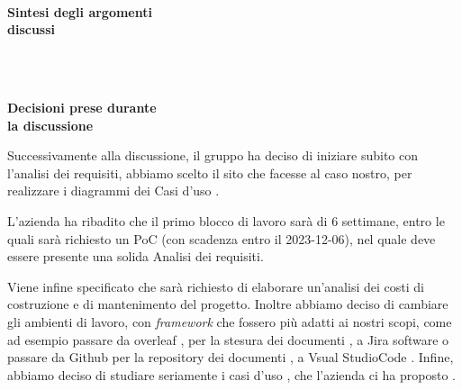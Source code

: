 \documentclass[10pt, a4paper]{article}
\title{\data}
\author{SWEetCode}
\begin{document}


\setlength{\columnsep}{2.2em}
\setlength{\columnseprule}{4pt}
\begin{paracol}{2}


\intestazione
\vspace{5.0em}

\partecipanti

\newpage

\switchcolumn
\revisioneAzioni
\vspace{23.5em}

\ordineGiorno

\newpage


\switchcolumn

\\
\textbf{Sintesi degli argomenti\\discussi}

~\newpage

\\
\textbf{Decisioni prese durante\\la discussione}

\switchcolumn

\discussione
Successivamente alla discussione, il gruppo ha deciso di iniziare subito con l'analisi dei requisiti, abbiamo scelto il sito che facesse al caso nostro, per realizzare i diagrammi dei Casi d'uso .

L'azienda ha ribadito che il primo blocco di lavoro sarà di 6 settimane, entro le quali sarà richiesto un PoC (con scadenza entro il 2023-12-06), nel quale deve essere presente una solida Analisi dei requisiti. 

Viene infine specificato che sarà richiesto di elaborare un'analisi dei costi di costruzione e di mantenimento del progetto.
Inoltre abbiamo deciso di cambiare gli ambienti di lavoro, con \textit{framework} che fossero più adatti ai nostri scopi, come ad esempio passare da overleaf , per la stesura dei documenti , a Jira software o passare da Github per la repository dei documenti , a Vsual StudioCode .
Infine, abbiamo deciso di studiare seriamente i casi d'uso , che l'azienda ci ha proposto .

\vspace{12.5em}

\decisioni

\end{paracol}
\end{document}
